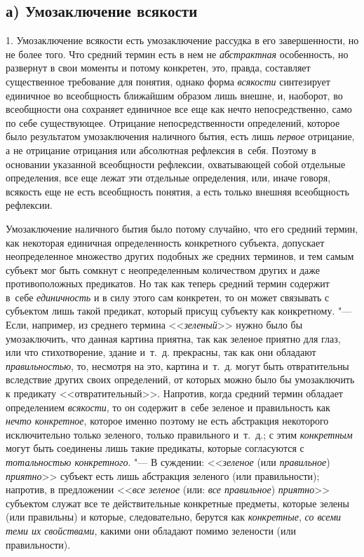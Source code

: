 \subsection[а) Умозаключение всякости]{а) Умозаключение всякости}
1. Умозаключение всякости есть умозаключение рассудка в его
завершенности, но не более того. Что средний термин есть в нем не
{\em абстрактная}
особенность, но развернут в свои моменты и потому конкретен,
это, правда, составляет существенное требование для понятия, однако форма
{\em всякости}
синтезирует единичное во всеобщность ближайшим образом лишь
внешне, и, наоборот, во всеобщности она сохраняет единичное все еще как
нечто непосредственно, само по себе существующее. Отрицание
непосредственности определений, которое было результатом умозаключения
наличного бытия, есть лишь {\em первое}
отрицание, а не отрицание отрицания или абсолютная рефлексия
в~себя. Поэтому в основании указанной всеобщности рефлексии, охватывающей
собой отдельные определения, все еще лежат эти отдельные определения, или,
иначе говоря, всякость еще не есть всеобщность понятия, а есть только
внешняя всеобщность рефлексии.

Умозаключение наличного бытия было потому случайно, что его
средний термин, как некоторая единичная определенность конкретного
субъекта, допускает неопределенное множество других подобных же средних
терминов, и тем самым субъект мог быть сомкнут с неопределенным количеством
других и даже противоположных предикатов. Но так как теперь средний термин
содержит в~себе {\em единичность}
и в силу этого сам конкретен, то он может связывать с
субъектом лишь такой предикат, который присущ субъекту как конкретному. "---
Если, например, из среднего термина
<<{\em зеленый}>> нужно
было бы умозаключить, что данная картина приятна, так как зеленое приятно
для глаз, или что стихотворение, здание и~т.~д. прекрасны, так как они
обладают {\em правильностью},
то, несмотря на это, картина и~т.~д. могут быть отвратительны
вследствие других своих определений, от которых можно было бы умозаключить
к предикату <<отвратительный>>. Напротив, когда средний термин обладает
определением {\em всякости},
то он содержит в~себе зеленое и правильность как
{\em нечто конкретное},
которое именно поэтому не есть абстракция некоторого
исключительно только зеленого, только правильного и~т.~д.; с этим
{\em конкретным} могут
быть соединены лишь такие предикаты, которые согласуются с
{\em тотальностью конкретного}. "---
В суждении:
<<{\em зеленое} (или
{\em правильное})
{\em приятно}>> субъект
есть лишь абстракция зеленого (или правильности); напротив, в предложении
<<{\em все зеленое} (или:
{\em все правильное})
{\em приятно}>> субъектом
служат все те действительные конкретные предметы, которые зелены (или
правильны) и которые, следовательно, берутся как
{\em конкретные},
{\em со всеми теми их свойствами},
какими они обладают помимо зелености (или правильности).

